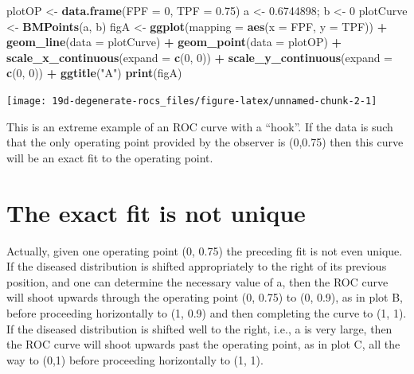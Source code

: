 \documentclass[
]{book}
\newenvironment{Shaded}{\begin{snugshade}}{\end{snugshade}}
\newcommand{\DataTypeTok}[1]{\textcolor[rgb]{0.13,0.29,0.53}{#1}}
\newcommand{\DecValTok}[1]{\textcolor[rgb]{0.00,0.00,0.81}{#1}}
\newcommand{\FloatTok}[1]{\textcolor[rgb]{0.00,0.00,0.81}{#1}}
\newcommand{\KeywordTok}[1]{\textcolor[rgb]{0.13,0.29,0.53}{\textbf{#1}}}
\newcommand{\NormalTok}[1]{#1}
\newcommand{\OperatorTok}[1]{\textcolor[rgb]{0.81,0.36,0.00}{\textbf{#1}}}
\newcommand{\StringTok}[1]{\textcolor[rgb]{0.31,0.60,0.02}{#1}}
\begin{document}
\begin{Shaded}
\begin{Highlighting}[]
\NormalTok{plotOP <-}\StringTok{ }\KeywordTok{data.frame}\NormalTok{(}\DataTypeTok{FPF =} \DecValTok{0}\NormalTok{, }\DataTypeTok{TPF =} \FloatTok{0.75}\NormalTok{)}
\NormalTok{a <-}\StringTok{ }\FloatTok{0.6744898}\NormalTok{; b <-}\StringTok{ }\DecValTok{0}
\NormalTok{plotCurve <-}\StringTok{ }\KeywordTok{BMPoints}\NormalTok{(a, b)}
\NormalTok{figA <-}\StringTok{ }\KeywordTok{ggplot}\NormalTok{(}\DataTypeTok{mapping =} \KeywordTok{aes}\NormalTok{(}\DataTypeTok{x =}\NormalTok{ FPF, }\DataTypeTok{y =}\NormalTok{ TPF)) }\OperatorTok{+}\StringTok{ }
\StringTok{  }\KeywordTok{geom_line}\NormalTok{(}\DataTypeTok{data =}\NormalTok{ plotCurve) }\OperatorTok{+}\StringTok{ }
\StringTok{  }\KeywordTok{geom_point}\NormalTok{(}\DataTypeTok{data =}\NormalTok{ plotOP)  }\OperatorTok{+}\StringTok{ }
\StringTok{  }\KeywordTok{scale_x_continuous}\NormalTok{(}\DataTypeTok{expand =} \KeywordTok{c}\NormalTok{(}\DecValTok{0}\NormalTok{, }\DecValTok{0}\NormalTok{)) }\OperatorTok{+}\StringTok{ }
\StringTok{  }\KeywordTok{scale_y_continuous}\NormalTok{(}\DataTypeTok{expand =} \KeywordTok{c}\NormalTok{(}\DecValTok{0}\NormalTok{, }\DecValTok{0}\NormalTok{)) }\OperatorTok{+}
\StringTok{  }\KeywordTok{ggtitle}\NormalTok{(}\StringTok{"A"}\NormalTok{)}
\KeywordTok{print}\NormalTok{(figA)}
\end{Highlighting}
\end{Shaded}

\begin{center}\texttt{[image: 19d-degenerate-rocs\_files/figure-latex/unnamed-chunk-2-1]} \end{center}

This is an extreme example of an ROC curve with a ``hook''. If the data is such that the only operating point provided by the observer is (0,0.75) then this curve will be an exact fit to the operating point.

\hypertarget{the-exact-fit-is-not-unique}{%
\section{The exact fit is not unique}\label{the-exact-fit-is-not-unique}}

Actually, given one operating point (0, 0.75) the preceding fit is not even unique. If the diseased distribution is shifted appropriately to the right of its previous position, and one can determine the necessary value of a, then the ROC curve will shoot upwards through the operating point (0, 0.75) to (0, 0.9), as in plot B, before proceeding horizontally to (1, 0.9) and then completing the curve to (1, 1). If the diseased distribution is shifted well to the right, i.e., a is very large, then the ROC curve will shoot upwards past the operating point, as in plot C, all the way to (0,1) before proceeding horizontally to (1, 1).
\end{document}
